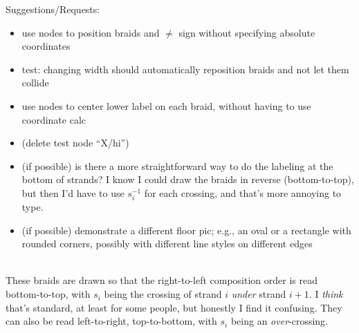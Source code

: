 \documentclass{article}
\begin{document}
Suggestions/Requests:
\begin{itemize}
\item use nodes to position braids and $\not =$ sign without specifying absolute coordinates
\item test: changing width should automatically reposition braids and not let them collide
\item use nodes to center lower label on each braid, without having to use coordinate calc
\item (delete test node ``X/hi'')
\item (if possible) is there a more straightforward way to do the labeling at the bottom of strands?  I know I could draw the braids in reverse (bottom-to-top), but then I'd have to use $s^{-1}_i$ for each crossing, and that's more annoying to type. 
\item (if possible) demonstrate a different floor pic; e.g., an oval or a rectangle with rounded corners, possibly with different line styles on different edges
\end{itemize}
\ \\

These braids are drawn so that the right-to-left composition order is read bottom-to-top, with $s_i$ being the crossing of strand $i$ \emph{under} strand $i+1$.
I \emph{think} that's standard, at least for some people, but honestly I find it confusing.
They can also be read left-to-right, top-to-bottom, with $s_i$ being an \emph{over}-crossing.\\
\end{document}
